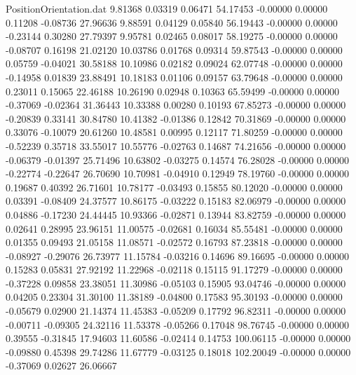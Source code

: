 \begin{filecontents}{PositionOrientation.dat}
   9.81368    0.03319    0.06471    54.17453   -0.00000    0.00000    0.11208   -0.08736   27.96636
   9.88591    0.04129    0.05840    56.19443   -0.00000    0.00000   -0.23144    0.30280   27.79397
   9.95781    0.02465    0.08017    58.19275   -0.00000    0.00000   -0.08707    0.16198   21.02120
  10.03786    0.01768    0.09314    59.87543   -0.00000    0.00000    0.05759   -0.04021   30.58188
  10.10986    0.02182    0.09024    62.07748   -0.00000    0.00000   -0.14958    0.01839   23.88491
  10.18183    0.01106    0.09157    63.79648   -0.00000    0.00000    0.23011    0.15065   22.46188
  10.26190    0.02948    0.10363    65.59499   -0.00000    0.00000   -0.37069   -0.02364   31.36443
  10.33388    0.00280    0.10193    67.85273   -0.00000    0.00000   -0.20839    0.33141   30.84780
  10.41382   -0.01386    0.12842    70.31869   -0.00000    0.00000    0.33076   -0.10079   20.61260
  10.48581    0.00995    0.12117    71.80259   -0.00000    0.00000   -0.52239    0.35718   33.55017
  10.55776   -0.02763    0.14687    74.21656   -0.00000    0.00000   -0.06379   -0.01397   25.71496
  10.63802   -0.03275    0.14574    76.28028   -0.00000    0.00000   -0.22774   -0.22647   26.70690
  10.70981   -0.04910    0.12949    78.19760   -0.00000    0.00000    0.19687    0.40392   26.71601
  10.78177   -0.03493    0.15855    80.12020   -0.00000    0.00000    0.03391   -0.08409   24.37577
  10.86175   -0.03222    0.15183    82.06979   -0.00000    0.00000    0.04886   -0.17230   24.44445
  10.93366   -0.02871    0.13944    83.82759   -0.00000    0.00000    0.02641    0.28995   23.96151
  11.00575   -0.02681    0.16034    85.55481   -0.00000    0.00000    0.01355    0.09493   21.05158
  11.08571   -0.02572    0.16793    87.23818   -0.00000    0.00000   -0.08927   -0.29076   26.73977
  11.15784   -0.03216    0.14696    89.16695   -0.00000    0.00000    0.15283    0.05831   27.92192
  11.22968   -0.02118    0.15115    91.17279   -0.00000    0.00000   -0.37228    0.09858   23.38051
  11.30986   -0.05103    0.15905    93.04746   -0.00000    0.00000    0.04205    0.23304   31.30100
  11.38189   -0.04800    0.17583    95.30193   -0.00000    0.00000   -0.05679    0.02900   21.14374
  11.45383   -0.05209    0.17792    96.82311   -0.00000    0.00000   -0.00711   -0.09305   24.32116
  11.53378   -0.05266    0.17048    98.76745   -0.00000    0.00000    0.39555   -0.31845   17.94603
  11.60586   -0.02414    0.14753   100.06115   -0.00000    0.00000   -0.09880    0.45398   29.74286
  11.67779   -0.03125    0.18018   102.20049   -0.00000    0.00000   -0.37069    0.02627   26.06667

\end{filecontents}
